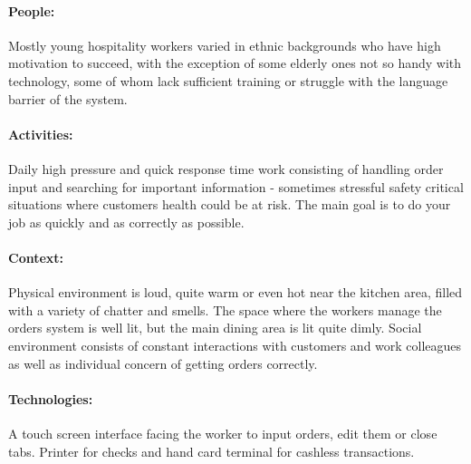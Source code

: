 \documentclass{article}
\begin{document}
\paragraph{\small People:} Mostly young hospitality workers varied in ethnic backgrounds who have high motivation to succeed, with the exception of some elderly ones not so handy with technology, some of whom lack sufficient training or struggle with the language barrier of the system.
\paragraph{\small Activities:} Daily high pressure and quick response time work consisting of handling order input and searching for important information - sometimes stressful safety critical situations where customers health could be at risk. The main goal is to do your job as quickly and as correctly as possible.
\paragraph{\small Context:} Physical environment is loud, quite warm or even hot near the kitchen area, filled with a variety of chatter and smells. The space where the workers manage the orders system is well lit, but the main dining area is lit quite dimly. Social environment consists of constant interactions with customers and work colleagues as well as individual concern of getting orders correctly.
\paragraph{\small Technologies:} A touch screen interface facing the worker to input orders, edit them or close tabs. Printer for checks and hand card terminal for cashless transactions.

\end{document}
